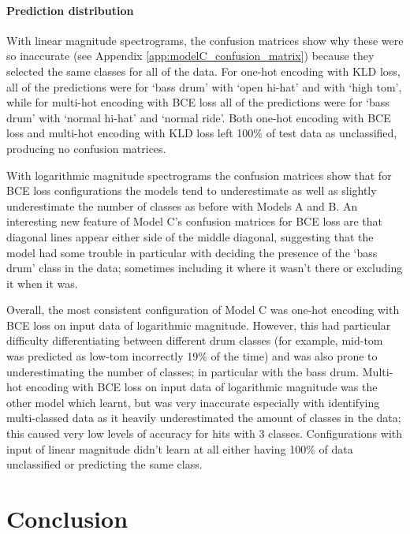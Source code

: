 \documentclass[12pt]{article}
\begin{document}
	\paragraph*{Prediction distribution}
	
	With linear magnitude spectrograms, the confusion matrices show why these were so inaccurate (see Appendix \ref{app:modelC_confusion_matrix}) because they selected the same classes for all of the data. For one-hot encoding with KLD loss, all of the predictions were for `bass drum' with `open hi-hat' and with `high tom', while for multi-hot encoding with BCE loss all of the predictions were for `bass drum' with `normal hi-hat' and `normal ride'. Both one-hot encoding with BCE loss and multi-hot encoding with KLD loss left 100\% of test data as unclassified, producing no confusion matrices.\medskip
	
	With logarithmic magnitude spectrograms the confusion matrices show that for BCE loss configurations the models tend to underestimate as well as slightly underestimate the number of classes as before with Models A and B. An interesting new feature of Model C's confusion matrices for BCE loss are that diagonal lines appear either side of the middle diagonal, suggesting that the model had some trouble in particular with deciding the presence of the `bass drum' class in the data; sometimes including it where it wasn't there or excluding it when it was.\medskip
	
	Overall, the most consistent configuration of Model C was one-hot encoding with BCE loss on input data of logarithmic magnitude. However, this had particular difficulty differentiating between different drum classes (for example, mid-tom was predicted as low-tom incorrectly 19\% of the time) and was also prone to underestimating the number of classes; in particular with the bass drum. Multi-hot encoding with BCE loss on input data of logarithmic magnitude was the other model which learnt, but was very inaccurate especially with identifying multi-classed data as it heavily underestimated the amount of classes in the data; this caused very low levels of accuracy for hits with 3 classes. Configurations with input of linear magnitude didn't learn at all either having 100\% of data unclassified or predicting the same class.\medskip 
	
	\newpage
	\section{Conclusion}
	
\end{document}
